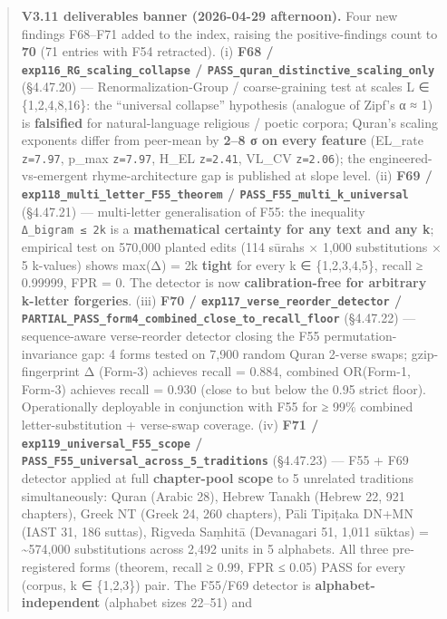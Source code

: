 \documentclass[
]{article}
\begin{document}
\begin{quote}
\textbf{V3.11 deliverables banner (2026-04-29 afternoon).} Four new
findings F68--F71 added to the index, raising the positive-findings
count to \textbf{70} (71 entries with F54 retracted). (i) \textbf{F68 /
\texttt{exp116\_RG\_scaling\_collapse} /
\texttt{PASS\_quran\_distinctive\_scaling\_only}} (§4.47.20) ---
Renormalization-Group / coarse-graining test at scales L ∈
\{1,2,4,8,16\}: the ``universal collapse'' hypothesis (analogue of
Zipf's α ≈ 1) is \textbf{falsified} for natural-language religious /
poetic corpora; Quran's scaling exponents differ from peer-mean by
\textbf{2--8 σ on every feature} (EL\_rate
\texttt{\textbar{}z\textbar{}=7.97}, p\_max
\texttt{\textbar{}z\textbar{}=7.97}, H\_EL
\texttt{\textbar{}z\textbar{}=2.41}, VL\_CV
\texttt{\textbar{}z\textbar{}=2.06}); the engineered-vs-emergent
rhyme-architecture gap is published at slope level. (ii) \textbf{F69 /
\texttt{exp118\_multi\_letter\_F55\_theorem} /
\texttt{PASS\_F55\_multi\_k\_universal}} (§4.47.21) --- multi-letter
generalisation of F55: the inequality \texttt{Δ\_bigram\ ≤\ 2k} is a
\textbf{mathematical certainty for any text and any k}; empirical test
on 570,000 planted edits (114 sūrahs × 1,000 substitutions × 5 k-values)
shows max(Δ) = 2k \textbf{tight} for every k ∈ \{1,2,3,4,5\}, recall ≥
0.99999, FPR = 0. The detector is now \textbf{calibration-free for
arbitrary k-letter forgeries}. (iii) \textbf{F70 /
\texttt{exp117\_verse\_reorder\_detector} /
\texttt{PARTIAL\_PASS\_form4\_combined\_close\_to\_recall\_floor}}
(§4.47.22) --- sequence-aware verse-reorder detector closing the F55
permutation-invariance gap: 4 forms tested on 7,900 random Quran 2-verse
swaps; gzip-fingerprint Δ (Form-3) achieves recall = 0.884, combined
OR(Form-1, Form-3) achieves recall = 0.930 (close to but below the 0.95
strict floor). Operationally deployable in conjunction with F55 for ≥
99\% combined letter-substitution + verse-swap coverage. (iv)
\textbf{F71 / \texttt{exp119\_universal\_F55\_scope} /
\texttt{PASS\_F55\_universal\_across\_5\_traditions}} (§4.47.23) --- F55
+ F69 detector applied at full \textbf{chapter-pool scope} to 5
unrelated traditions simultaneously: Quran (Arabic 28), Hebrew Tanakh
(Hebrew 22, 921 chapters), Greek NT (Greek 24, 260 chapters), Pāli
Tipiṭaka DN+MN (IAST 31, 186 suttas), Rigveda Saṃhitā (Devanagari 51,
1,011 sūktas) = \textasciitilde574,000 substitutions across 2,492 units
in 5 alphabets. All three pre-registered forms (theorem, recall ≥ 0.99,
FPR ≤ 0.05) PASS for every (corpus, k ∈ \{1,2,3\}) pair. The F55/F69
detector is \textbf{alphabet-independent} (alphabet sizes 22--51) and

\end{quote}
\end{document}
